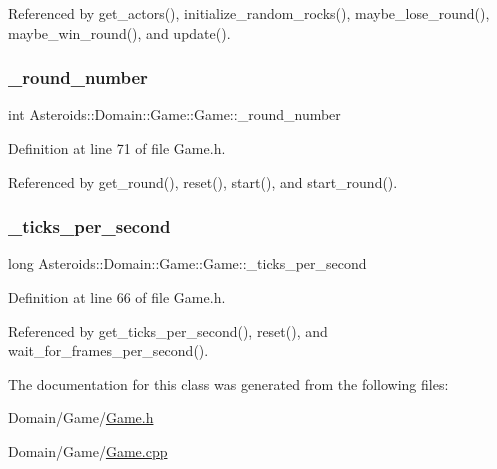 Referenced by get\+\_\+actors(), initialize\+\_\+random\+\_\+rocks(), maybe\+\_\+lose\+\_\+round(), maybe\+\_\+win\+\_\+round(), and update().

\mbox{\label{classAsteroids_1_1Domain_1_1Game_1_1Game_a2992a61faa00be0bf512fed5c72fbc07}} 
\subsubsection{\texorpdfstring{\+\_\+round\+\_\+number}{\_round\_number}}
{\footnotesize\ttfamily int Asteroids\+::\+Domain\+::\+Game\+::\+Game\+::\+\_\+round\+\_\+number\hspace{0.3cm}{\ttfamily [private]}}



Definition at line 71 of file Game.\+h.



Referenced by get\+\_\+round(), reset(), start(), and start\+\_\+round().

\mbox{\label{classAsteroids_1_1Domain_1_1Game_1_1Game_ab370339e44ac6ac2aa78bfdde8bc7ea5}} 
\subsubsection{\texorpdfstring{\+\_\+ticks\+\_\+per\+\_\+second}{\_ticks\_per\_second}}
{\footnotesize\ttfamily long Asteroids\+::\+Domain\+::\+Game\+::\+Game\+::\+\_\+ticks\+\_\+per\+\_\+second\hspace{0.3cm}{\ttfamily [private]}}



Definition at line 66 of file Game.\+h.



Referenced by get\+\_\+ticks\+\_\+per\+\_\+second(), reset(), and wait\+\_\+for\+\_\+frames\+\_\+per\+\_\+second().



The documentation for this class was generated from the following files\+:\begin{DoxyCompactItemize}
\item 
Domain/\+Game/\hyperlink{Game_8h}{Game.\+h}\item 
Domain/\+Game/\hyperlink{Game_8cpp}{Game.\+cpp}\end{DoxyCompactItemize}
